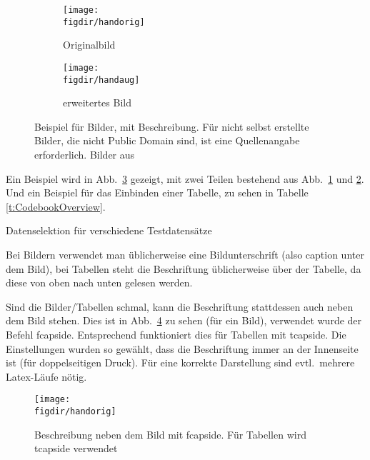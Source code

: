 \begin{figure}[t]
\centering

\begin{subfigure}{0.35\linewidth}
\centering
\texttt{[image: \\figdir/handorig]}
\caption{Originalbild}
\label{FIG:arexorig}
\end{subfigure}
\hspace{1cm}
\begin{subfigure}{0.35\linewidth}
\centering
\texttt{[image: \\figdir/handaug]}
\caption{erweitertes Bild}
\label{FIG:arexaugm}
\end{subfigure}
%
\caption[AR Beispiel]
{Beispiel für Bilder, mit Beschreibung. Für nicht selbst erstellte Bilder, die nicht Public Domain sind, ist eine Quellenangabe erforderlich. Bilder aus \cite{Schmidt01:PAO}}
\label{FIG:arex}
\end{figure}

Ein Beispiel wird in Abb.\ \ref{FIG:arex} gezeigt, mit zwei Teilen  bestehend aus Abb.\ \ref{FIG:arexorig} und \ref{FIG:arexaugm}.
Und ein Beispiel für das Einbinden einer Tabelle, zu sehen in Tabelle \ref{t:CodebookOverview}.

\begin{table}[t]
\centering\small
 \caption[Testtabelle]{Datenselektion für verschiedene Testdatensätze}
  \label{t:CodebookOverview}

\end{table}

Bei Bildern verwendet man üblicherweise eine Bildunterschrift (also caption  unter dem Bild), bei Tabellen steht die Beschriftung üblicherweise über der Tabelle, da diese von oben nach unten gelesen werden.

Sind die Bilder/Tabellen schmal, kann die Beschriftung stattdessen auch neben dem Bild stehen.
Dies ist in Abb.\ \ref{fig:beschreibung-neben-bild} zu sehen (für ein Bild), verwendet wurde der Befehl fcapside.
Entsprechend funktioniert dies für Tabellen mit tcapside.
Die Einstellungen wurden so gewählt, dass die Beschriftung immer an der Innenseite ist (für doppelseitigen Druck).
Für eine korrekte Darstellung sind evtl.\ mehrere Latex-Läufe nötig.

\begin{figure}[t]
\fcapside
{\caption{Beschreibung neben dem Bild mit fcapside. Für Tabellen wird tcapside verwendet}
\label{fig:beschreibung-neben-bild}}
{\texttt{[image: \\figdir/handorig]}}
\end{figure}

